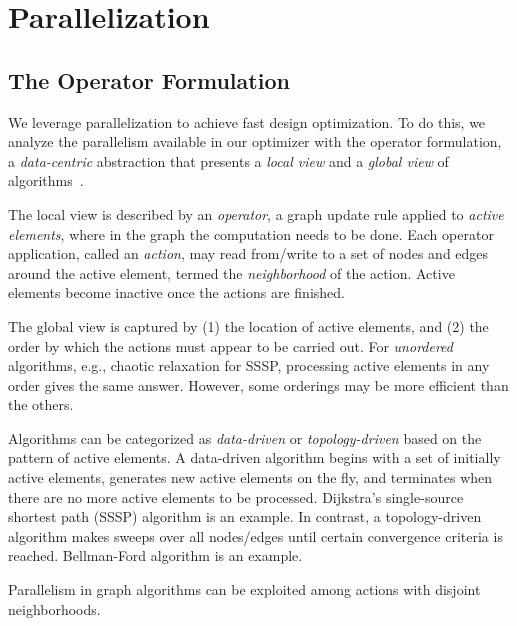 \section{Parallelization}
\label{sec:parallel}

\subsection{The Operator Formulation}

We leverage parallelization to achieve fast design optimization. To do this, we analyze the parallelism available in our optimizer with the operator formulation, a {\em data-centric} abstraction that presents a {\em local view} and a {\em global view} of algorithms~\cite{pingali11}.

The local view is described by an {\em operator}, a graph update rule applied to {\em active elements}, where in the graph the computation needs to be done. Each operator application, called an {\em action}, may read from/write to a set of nodes and edges around the active element, termed the {\em neighborhood} of the action. Active elements become inactive once the actions are finished.

The global view is captured by (1) the location of active elements, and (2) the order by which the actions must appear to be carried out. For {\em unordered} algorithms, e.g., chaotic relaxation for SSSP, processing active elements in any order gives the same answer. However, some orderings may be more efficient than the others.


Algorithms can be categorized as {\em data-driven} or {\em topology-driven} based on the pattern of active elements. A data-driven algorithm begins with a set of initially active elements, generates new active elements on the fly, and terminates when there are no more active elements to be processed. Dijkstra's single-source shortest path (SSSP) algorithm is an example. In contrast, a topology-driven algorithm makes sweeps over all nodes/edges until certain convergence criteria is reached. Bellman-Ford algorithm is an example.

Parallelism in graph algorithms can be exploited among actions with disjoint neighborhoods.

